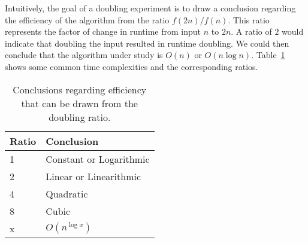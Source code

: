 Intuitively, the goal of a doubling experiment is to draw a conclusion regarding the efficiency of the algorithm from
the ratio $f(2n)/f(n)$. This ratio represents the factor of change in runtime from input $n$ to $2n$. A ratio of $2$
would indicate that doubling the input resulted in runtime doubling. We could then conclude that the algorithm under
study is $O(n)$ or $O(n\log n)$.  Table~\ref{table:ratios} shows some common time complexities and the corresponding
ratios.

\begin{table}[h]
\begin{tabular}{l|l}
Ratio & Conclusion              \\ \hline
1     & Constant or Logarithmic \\
2     & Linear or Linearithmic  \\
4     & Quadratic               \\
8     & Cubic                   \\
x     & $O(n^{\log x})$
\end{tabular}
\label{table:ratios}
\caption{Conclusions regarding efficiency that can be drawn from the
doubling ratio.}
\end{table}
